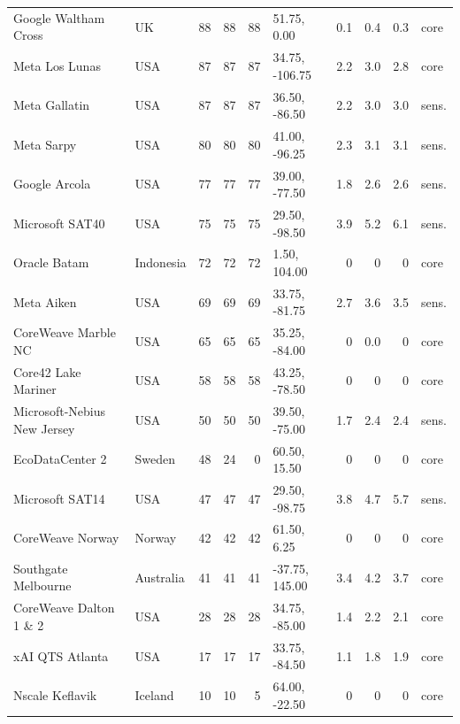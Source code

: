 \begin{footnotesize}
\begin{longtable}{@{}p{46mm}lrrrlrrrl@{}}
Google Waltham Cross & UK & 88 & 88 & 88 & 51.75, 0.00 & 0.1 & 0.4 & 0.3 & core \\
Meta Los Lunas & USA & 87 & 87 & 87 & 34.75, -106.75 & 2.2 & 3.0 & 2.8 & core \\
Meta Gallatin & USA & 87 & 87 & 87 & 36.50, -86.50 & 2.2 & 3.0 & 3.0 & sens. \\
Meta Sarpy & USA & 80 & 80 & 80 & 41.00, -96.25 & 2.3 & 3.1 & 3.1 & sens. \\
Google Arcola & USA & 77 & 77 & 77 & 39.00, -77.50 & 1.8 & 2.6 & 2.6 & sens. \\
Microsoft SAT40 & USA & 75 & 75 & 75 & 29.50, -98.50 & 3.9 & 5.2 & 6.1 & sens. \\
Oracle Batam & Indonesia & 72 & 72 & 72 & 1.50, 104.00 & 0 & 0 & 0 & core \\
Meta Aiken & USA & 69 & 69 & 69 & 33.75, -81.75 & 2.7 & 3.6 & 3.5 & sens. \\
CoreWeave Marble NC & USA & 65 & 65 & 65 & 35.25, -84.00 & 0 & 0.0 & 0 & core \\
Core42 Lake Mariner & USA & 58 & 58 & 58 & 43.25, -78.50 & 0 & 0 & 0 & core \\
Microsoft-Nebius New Jersey & USA & 50 & 50 & 50 & 39.50, -75.00 & 1.7 & 2.4 & 2.4 & sens. \\
EcoDataCenter 2 & Sweden & 48 & 24 & 0 & 60.50, 15.50 & 0 & 0 & 0 & core \\
Microsoft SAT14 & USA & 47 & 47 & 47 & 29.50, -98.75 & 3.8 & 4.7 & 5.7 & sens. \\
CoreWeave Norway & Norway & 42 & 42 & 42 & 61.50, 6.25 & 0 & 0 & 0 & core \\
Southgate Melbourne & Australia & 41 & 41 & 41 & -37.75, 145.00 & 3.4 & 4.2 & 3.7 & core \\
CoreWeave Dalton 1 \& 2 & USA & 28 & 28 & 28 & 34.75, -85.00 & 1.4 & 2.2 & 2.1 & core \\
xAI QTS Atlanta & USA & 17 & 17 & 17 & 33.75, -84.50 & 1.1 & 1.8 & 1.9 & core \\
Nscale Keflavik & Iceland & 10 & 10 & 5 & 64.00, -22.50 & 0 & 0 & 0 & core \\
\bottomrule
\end{longtable}
\end{footnotesize}
